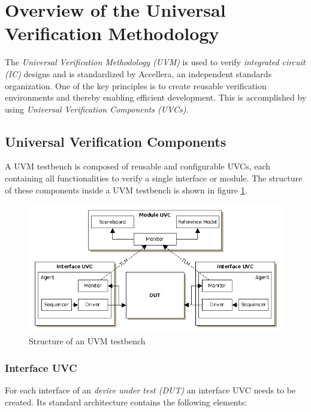 \section{Overview of the Universal Verification Methodology}\label{uvm}

The \emph{Universal Verification Methodology (UVM)} is used to verify
\emph{integrated circuit (IC)} designs and is standardized by Accellera,
an independent standards organization. One of the key principles is to create
reusable verification environments and thereby enabling efficient development.
This is accomplished by using \emph{Universal Verification Components (UVCs)}.

\subsection{Universal Verification Components}\label{uvc}

A UVM testbench is composed of reusable and configurable UVCs, each
containing all functionalities to verify a single interface or module. The
structure of these components inside a UVM testbench is shown in figure
\ref{fig:UVM_testbench}.

\begin{figure}[htb]
 \centering
 \includegraphics[width=1.0\textwidth,angle=0]{abb/UVM_testbench}
 \caption{Structure of an UVM testbench}
\label{fig:UVM_testbench}
\end{figure}

\subsubsection{Interface UVC}\label{interface_uvc}

For each interface of an \emph{device under test (DUT)} an interface UVC needs
to be created. Its standard architecture contains the following elements:

